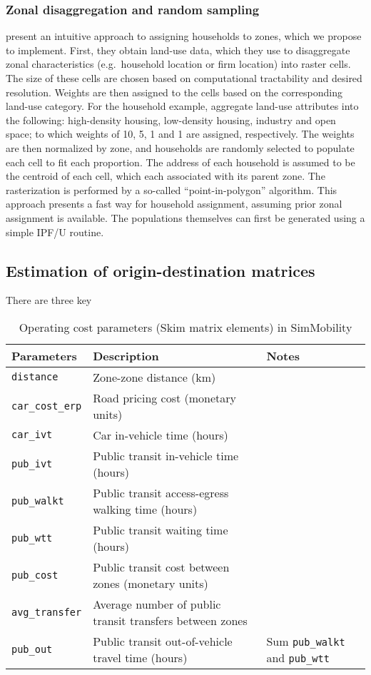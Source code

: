 \documentclass[11pt,twoside]{article}
\numberwithin{equation}{section}
\newcommand{\?}{\stackrel{?}{=}}
\begin{document}
\subsubsection{Zonal disaggregation and random sampling}
\textcite{moekel2003microsimulation} present an intuitive approach to assigning households to zones, which we propose to implement.
First, they obtain land-use data, which they use to disaggregate zonal characteristics (e.g.\ household location or firm location) into raster cells.
The size of these cells are chosen based on computational tractability and desired resolution.
Weights are then assigned to the cells based on the corresponding land-use category.
For the household example, \textcite{moekel2003microsimulation} aggregate land-use attributes into the following: high-density housing, low-density housing, industry and open space;
to which weights of 10, 5, 1 and 1 are assigned, respectively.
The weights are then normalized by zone, and households are randomly selected to populate each cell to fit each proportion.
The address of each household is assumed to be the centroid of each cell, which each associated with its parent zone.
The rasterization is performed by a so-called ``point-in-polygon'' algorithm.
This approach presents a fast way for household assignment, assuming prior zonal assignment is available.
The populations themselves can first be generated using a simple IPF/U routine.


\subsection{Estimation of origin-destination matrices}
There are three key

\begin{table}[h!]\small
  \centering
  \begin{tabular}{l l l } \toprule
    \textbf{Parameters}            & \textbf{Description}  & \textbf{Notes} \\ \midrule
    \texttt{distance}     & Zone-zone distance (km) & \\
    \texttt{car\_cost\_erp} & Road pricing cost (monetary units) &  \\
    \texttt{car\_ivt}     & Car in-vehicle time  (hours) & \\
    \texttt{pub\_ivt}     & Public transit in-vehicle time (hours) & \\
    \texttt{pub\_walkt}   & Public transit access-egress walking time (hours) & \\
    \texttt{pub\_wtt}     & Public transit waiting time (hours) & \\
    \texttt{pub\_cost}    & Public transit cost between zones (monetary units) & \\
    \texttt{avg\_transfer}& Average number of public transit transfers between zones & \\
    \texttt{pub\_out}     & Public transit out-of-vehicle travel time (hours) & Sum  \texttt{pub\_walkt} and  \texttt{pub\_wtt} \\ \bottomrule
  \end{tabular}
  \caption{Operating cost parameters (Skim matrix elements) in SimMobility}
  \label{tab:opcosts}
\end{table}
\end{document}

